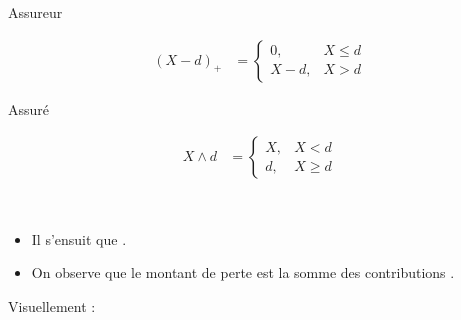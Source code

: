 \documentclass[10pt, french]{article}
\begin{document}
\begin{multicols*}{2}
\begin{definitionNOHFILLsub}
\begin{minipage}[ht]{0.5\columnwidth}
\begin{center}
	Assureur
\end{center}
\begin{align*}
	(X - d)_{+}
	&=	\begin{cases}
		0,	  	&	X \leq d	\\
		X - d,	&	X > d	
		\end{cases}
\end{align*}
\end{minipage}%
\begin{minipage}[ht]{0.5\columnwidth}
\begin{center}
	Assuré
\end{center}
\begin{align*}
	X \wedge d
	&=	\begin{cases}
		X,  &	X < d	\\
		d,	&	X \geq d	
		\end{cases}
\end{align*}
\end{minipage}

\

\begin{itemize}
	\item	Il s'ensuit que .
	\item	On observe que le montant de perte est la somme des contributions .
\end{itemize}

Visuellement :
\begin{center}
\begin{tikzpicture}[x=0.75pt,y=0.75pt,yscale=-1,xscale=1]


\end{tikzpicture}
\end{center}
\end{definitionNOHFILLsub}
\end{multicols*}
\end{document}
